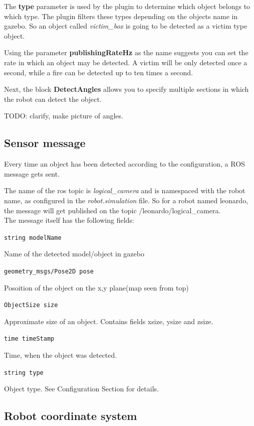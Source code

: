 The \textbf{type} parameter is used by the plugin to determine which object belongs to which type. The plugin filters these types depending on the objects name in gazebo. So an object called \textit{victim\_box} is going to be detected as a victim type object.

Using the parameter \textbf{publishingRateHz} as the name suggests you can set the rate in which an object may be detected. A victim will be only detected once a second, while a fire can be detected up to ten times a second.

Next, the block \textbf{DetectAngles} allows you to specify multiple sections in which the robot can detect the object.
 
TODO: clarify, make picture of angles.

\subsection{Sensor message}

Every time an object has been detected according to the configuration, a ROS message gets sent.

The name of the ros topic is \textit{logical\_camera} and is namespaced with the robot name, as configured in the \textit{robot.simulation} file. So for a robot named leonardo, the message will get published on the topic  /leonardo/logical\_camera.\\

The message itself has the following fields:

\texttt{string modelName}

	Name of the detected model/object in gazebo

\texttt{geometry\_msgs/Pose2D pose}

	Posoition of the object on the x,y plane(map seen from top)

\texttt{ObjectSize size}

	Approximate size of an object. Contains fields xsize, ysize and zsize.

\texttt{time timeStamp}

	Time, when the object was detected.

\texttt{string type}

	Object type. See Configuration Section for details.

\newpage
\subsection{Robot coordinate system}

